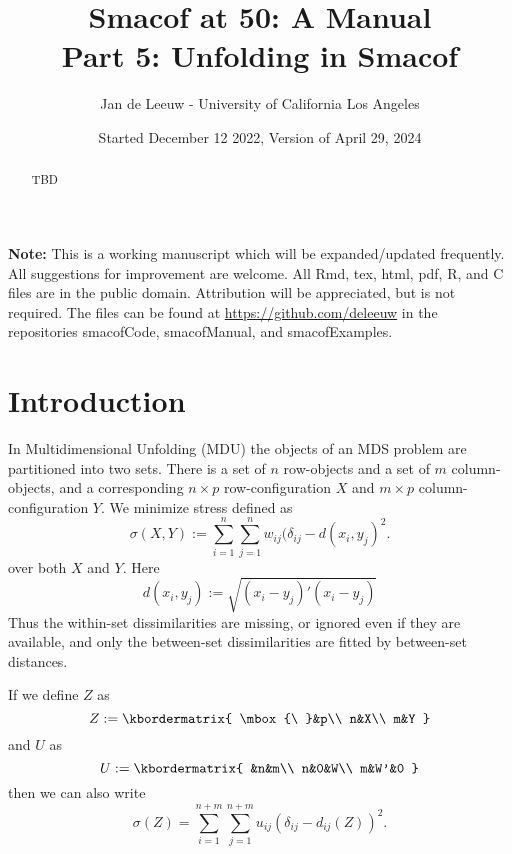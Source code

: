 \documentclass[
  12pt,
]{article}
\title{Smacof at 50: A Manual\\
Part 5: Unfolding in Smacof}
\author{Jan de Leeuw - University of California Los Angeles}
\date{Started December 12 2022, Version of April 29, 2024}
\begin{document}
\maketitle
\begin{abstract}
TBD
\end{abstract}

{
\setcounter{tocdepth}{3}
\tableofcontents
}
\textbf{Note:} This is a working manuscript which will be expanded/updated
frequently. All suggestions for improvement are welcome. All Rmd, tex,
html, pdf, R, and C files are in the public domain. Attribution will be
appreciated, but is not required. The files can be found at
\url{https://github.com/deleeuw} in the repositories smacofCode, smacofManual,
and smacofExamples.

\section{Introduction}\label{introduction}

In Multidimensional Unfolding (MDU) the objects of an MDS problem are partitioned into two sets.
There is a set of \(n\) row-objects and a set of
\(m\) column-objects, and a corresponding \(n\times p\) row-configuration \(X\) and \(m\times p\) column-configuration
\(Y\). We minimize stress defined as
\begin{equation}
\sigma(X,Y):=\sum_{i=1}^{n}\sum_{j=1}^{n}w_{ij}(\delta_{ij}-d(x_i,y_j)^2.
\label{eq:ufstress}
\end{equation}
over both \(X\) and \(Y\). Here
\begin{equation}
d(x_i,y_j):=\sqrt{(x_i-y_j)'(x_i-y_j)}
\label{eq:ufdist}
\end{equation}
Thus the within-set
dissimilarities are missing, or ignored even if they are available, and only the between-set dissimilarities are fitted by between-set distances.

If we define \(Z\) as
\begin{equation}
Z:=
\kbordermatrix{
\mbox{\ }&p\\
n&X\\
m&Y
}
\label{eq:ufzdef}
\end{equation}
and \(U\) as
\begin{equation}
U:=
\kbordermatrix{
&n&m\\
n&0&W\\
m&W'&0
}
\label{eq:ufudef}
\end{equation}
then we can also write
\begin{equation}
\sigma(Z)=\sum_{i=1}^{n+m}\sum_{j=1}^{n+m}u_{ij}(\delta_{ij}-d_{ij}(Z))^2.
\label{eq:ufzstress}
\end{equation}
\end{document}
